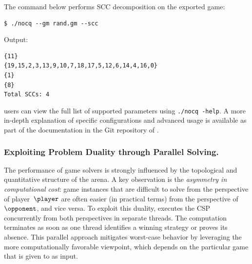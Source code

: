 \documentclass[a4paper,UKenglish,cleveref, autoref, thm-restate, anonymous]{lipics-v2021}
\begin{document}
\noindent The command below performs SCC decomposition on the exported game:
\begin{lstlisting}
$ ./nocq --gm rand.gm --scc
\end{lstlisting}

\noindent Output:
\begin{lstlisting}
{11}
{19,15,2,3,13,9,10,7,18,17,5,12,6,14,4,16,0}
{1}
{8}
Total SCCs: 4
\end{lstlisting}

\noindent \nocq users can view the full list of supported parameters using \texttt{./nocq -\-help}. A more in-depth explanation of specific configurations and advanced usage is available as part of the documentation in the Git repository of \nocq. 

\subsubsection{Exploiting Problem Duality through Parallel Solving.}

The performance of game solvers is strongly influenced by the topological and quantitative structure of the arena. A key observation is the \emph{asymmetry in computational cost}: game instances that are difficult to solve from the perspective of player~$\player$ are often easier (in practical terms) from the perspective of $\opponent$, and vice versa.
%
To exploit this duality, \nocq executes the CSP concurrently from both perspectives in separate threads. The computation terminates as soon as one thread identifies a winning strategy or proves its absence. This parallel approach mitigates worst-case behavior by leveraging the more computationally favorable viewpoint, which depends on the particular game that is given to \nocq as input. 



\end{document}
